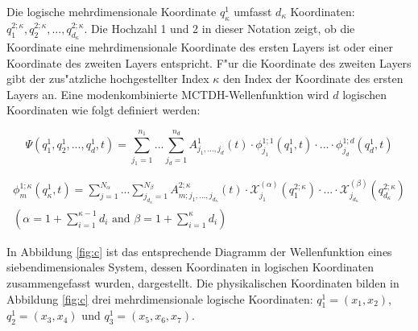 Die logische mehrdimensionale Koordinate $ q^1_\kappa $ umfasst $d_\kappa $ Koordinaten:  $q^{2;\kappa}_1, q^{2;\kappa}_2, ..., q^{2;\kappa}_{d_\kappa} $.
Die Hochzahl 1 und 2 in dieser Notation zeigt, ob die Koordinate eine mehrdimensionale Koordinate des ersten Layers ist oder einer Koordinate
des zweiten Layers entspricht. F"ur die Koordinate des zweiten Layers gibt der zus"atzliche hochgestellter Index $\kappa$
den Index der Koordinate des ersten Layers an.
Eine modenkombinierte MCTDH-Wellenfunktion wird $d$ logischen Koordinaten wie folgt definiert werden:

\begin{equation}
 \Psi(q^{1}_{1},q^{1}_{2},..., q^{1}_{d}, t)=\sum^{n_{1}}_{j_{1}=1} ... \sum^{n_{d}}_{j_{d}=1} A^{1}_{j_{1}, ..., j_{d}}(t)
 \cdot \phi^{1;1}_{j_{1}}(q^1_{1}, t) \cdot ... \cdot \phi^{1;d}_{j_{d}}(q^1_{d}, t)
 \label{Eq:mode_comb_wave}
 \end{equation}

\begin{equation}
  \begin{gathered}
 \phi^{1;\kappa}_{m} (q^1_{\kappa}, t)=\sum^{N_{\alpha}}_{j=1} ... \sum^{N_{\beta}}_{j_{d_\kappa}=1} A^{2;\kappa}_{m;j_1,...,j_{d_\kappa}}(t)
 \cdot \mathcal{X}^{(\alpha)}_{j_1}(q^{2;\kappa}_1) \cdot ... \cdot
 \mathcal{X}^{(\beta)}_{j_{d_\kappa}}(q^{2;\kappa}_{d_\kappa})\\
 \left( \alpha = 1 + \sum^{\kappa - 1}_{i=1}d_i \text{ and }  \beta = 1 + \sum^{\kappa}_{i=1}d_i\right)
 \label{Eq:mode_SPF}
\end{gathered}
 \end{equation}

In Abbildung \ref{fig:c} ist das entsprechende Diagramm der Wellenfunktion eines siebendimensionales System, dessen Koordinaten 
in logischen Koordinaten zusammengefasst wurden, dargestellt.
Die physikalischen Koordinaten bilden in Abbildung \ref{fig:c} drei mehrdimensionale logische Koordinaten:
 $q^{1}_{1} = \left(x_1, x_2 \right)$, $ q^{1}_{2} = \left(x_3, x_4 \right)$
und $ q^{1}_{3} = \left(x_5, x_6, x_7 \right)$.


